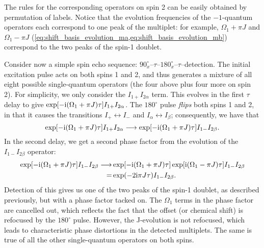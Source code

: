 The rules for the corresponding operators on spin 2 can be easily obtained by permutation of labels.
Notice that the evolution frequencies of the $-1$-quantum operators each correspond to one peak of the multiplet: for example, $\Omega_1 + \pi J$ and $\Omega_1 - \pi J$ (\cref{eq:shift_basis_evolution_ma,eq:shift_basis_evolution_mb}) correspond to the two peaks of the spin-1 doublet.

Consider now a simple spin echo sequence: $90^\circ_{x}$--$\tau$--$180^\circ_{x}$--$\tau$--detection.
The initial excitation pulse acts on both spins 1 and 2, and thus generates a mixture of all eight possible single-quantum operators (the four above plus four more on spin 2).
For simplicity, we only consider the $I_{1+}I_{2\alpha}$ term.
This evolves in the first $\tau$ delay to give $\exp[-\mathrm{i}(\Omega_1 + \pi J)\tau] I_{1+}I_{2\alpha}$.
The $180^\circ$ pulse \textit{flips} both spins 1 and 2, in that it causes the transitions $I_+ \leftrightarrow I_-$ and $I_\alpha \leftrightarrow I_\beta$; consequently, we have that
\begin{equation}
    \label{eq:spin_echo_1}
    \exp[-\mathrm{i}(\Omega_1 + \pi J)\tau] I_{1+}I_{2\alpha} \longrightarrow \exp[-\mathrm{i}(\Omega_1 + \pi J)\tau] I_{1-}I_{2\beta}.
\end{equation}
In the second delay, we get a second phase factor from the evolution of the $I_{1-}I_{2\beta}$ operator:
\begin{align}
    \label{eq:spin_echo_2}
    \exp[-\mathrm{i}(\Omega_1 + \pi J)\tau] I_{1-}I_{2\beta} \longrightarrow
    &\exp[-\mathrm{i}(\Omega_1 + \pi J)\tau] \exp[\mathrm{i}(\Omega_1 - \pi J)\tau] I_{1-}I_{2\beta} \notag \\
    = &\exp(-2\mathrm{i} \pi J\tau) I_{1-}I_{2\beta}.
\end{align}
Detection of this gives us one of the two peaks of the spin-1 doublet, as described previously, but with a phase factor tacked on.
The $\Omega_1$ terms in the phase factor are cancelled out, which reflects the fact that the offset (or chemical shift) is refocused by the $180^\circ$ pulse.
However, the J-evolution is not refocused, which leads to characteristic phase distortions in the detected multiplets.
The same is true of all the other single-quantum operators on both spins.

